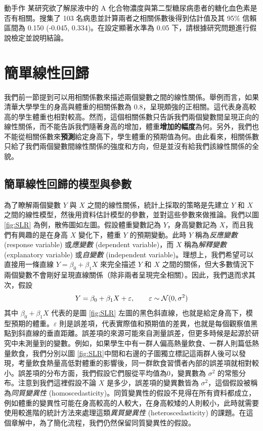     \answerbox{220pt}
    
    \bigskip 

    \begin{custom}{動手作}
        某研究欲了解尿液中的 A 化合物濃度與第二型糖尿病患者的糖化血色素是否有相關。搜集了 103 名病患並計算兩者之相關係數後得到估計值及其 95\% 信賴區間為 0.150 (-0.045, 0.334)。在設定顯著水準為 0.05 下，請根據研究問題進行假說檢定並說明結論。
    \end{custom}

    \answerbox{220pt}
    
    \bigskip 

\section{簡單線性回歸}

    我們前一節提到可以用相關係數來描述兩個變數之間的線性關係。舉例而言，如果清華大學學生的身高與體重的相關係數為 0.8，呈現頗強的正相關。這代表身高較高的學生體重也相對較高。然而，這個相關係數只告訴我們兩個變數間呈現正向的線性關係，而不能告訴我們隨著身高的增加，體重\textbf{增加的幅度}為何。另外，我們也不能從相關係數來\textbf{預測}給定身高下，學生體重的預期值為何。由此看來，相關係數只給了我們兩個變數間線性關係的強度和方向，但是並沒有給我們該線性關係的全貌。

    \subsection{簡單線性回歸的模型與參數}
    
    為了瞭解兩個變數 $Y$ 與 $X$ 之間的線性關係，統計上採取的策略是先建立 $Y$ 和 $X$ 之間的線性模型，然後用資料估計模型的參數，並對這些參數來做推論。我們以圖 \ref{fig:SLR} 為例，散佈圖如左圖。假設體重變數記為 $Y$，身高變數記為 $X$，而且我們有興趣的是在身高 $X$ 變化下，體重 $Y$ 的預期變動。此時 $Y$ 稱為\textit{反應變數} (response variable) 或\textit{應變數} (dependent variable)，而 $X$ 稱為\textit{解釋變數} (explanatory variable) 或\textit{自變數} (independent variable)。理想上，我們希望可以直接用一條直線 $Y = \beta_0 + \beta_1 X$ 來完全描述 $Y$ 和 $X$ 之間的關係，但大多數情況下兩個變數不會剛好呈現直線關係（除非兩者呈現完全相關）。因此，我們退而求其次，假設
    \smallskip
    \[Y = \beta_0 + \beta_1 X + \varepsilon, \qquad \varepsilon \sim \mathcal{N}(0, \sigma^2)\]
    \smallskip
    其中 $\beta_0 + \beta_1 X$ 代表的是圖 \ref{fig:SLR} 左圖的黑色斜直線，也就是給定身高下，模型預期的體重。$\varepsilon$ 則是誤差項，代表實際值和預期值的差異，也就是每個觀察值黑點到斜直線的垂直距離。誤差項的來源可能來自測量誤差，但更多時候是起源於研究中未測量到的變數。例如，如果學生中有一群人偏高熱量飲食、一群人則篇低熱量飲食，我們分別以圖 \ref{fig:SLR}中間和右邊的子圖獨立標記這兩群人後可以發現，考量飲食熱量高低對體重的影響後，同一群飲食習慣者內部的誤差項就相對較小。誤差項的分布方面，我們假設它們服從平均值為$0$，變異數為 $\sigma^2$ 的常態分布。注意到我們這裡假設不論 $X$ 是多少，誤差項的變異數皆為 $\sigma^2$，這個假設被稱為\textit{同質變異性} (homoscedasticity)。同質變異性的假設不見得在所有資料都成立，例如體重的變異性可能在身高較高的人較大，在身高較矮的人則較小，此時就需要使用較進階的統計方法來處理這類\textit{異質變異性} (heteroscedasticity) 的課題。在這個章解中，為了簡化流程，我們仍然保留同質變異性的假設。

